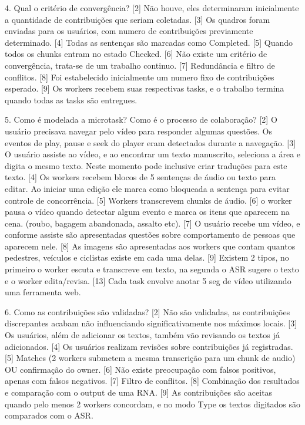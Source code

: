 4.	Qual o critério de convergência?
[2] Não houve, eles determinaram inicialmente a quantidade de contribuições que seriam coletadas.
[3] Os quadros foram enviadas para os usuários, com numero de contribuições previamente determinado.
[4] Todas as sentenças são marcadas como Completed.
[5] Quando todos os chunks entram no estado Checked.
[6] Não existe um critério de convergência, trata-se de um trabalho continuo. 
[7] Redundância e filtro de conflitos.
[8] Foi estabelecido inicialmente um numero fixo de contribuições esperado.
[9] Os workers recebem suas respectivas tasks, e o trabalho termina quando todas as tasks são entregues.

5.	Como é modelada a microtask? Como é o processo de colaboração?
[2] O usuário precisava navegar pelo vídeo para responder algumas questões. Os eventos de play, pause e seek do player eram detectados durante a navegação.
[3] O usuário assiste ao vídeo, e ao encontrar um texto manuscrito, seleciona a área e digita o mesmo texto. Neste momento pode inclusive criar traduções para este texto.
[4] Os workers recebem blocos de 5 sentenças de áudio ou texto para editar. Ao iniciar uma edição ele marca como bloqueada a sentença para evitar controle de concorrência.
[5] Workers transcrevem chunks de áudio.
[6] o worker pausa o vídeo quando detectar algum evento e marca os itens que aparecem na cena. (roubo, bagagem abandonada, assalto etc).
[7] O usuário recebe um vídeo, e conforme assiste são apresentadas questões sobre comportamento de pessoas que aparecem nele.
[8] As imagens são apresentadas aos workers que contam quantos pedestres, veículos e ciclistas existe em cada uma delas.
[9] Existem 2 tipos, no primeiro o worker escuta e transcreve em texto, na segunda o ASR sugere o texto e o worker edita/revisa.
[13] Cada task envolve anotar 5 seg de vídeo utilizando uma ferramenta web.


6.	Como as contribuições são validadas?
[2] Não são validadas, as contribuições discrepantes acabam não influenciando significativamente nos máximos locais.
[3] Os usuários, além de adicionar os textos, também vão revisando os textos já adicionados.
[4] Os usuários realizam revisões sobre contribuições já registradas.
[5] Matches (2 workers submetem a mesma transcrição para um chunk de audio) OU confirmação do owner.
[6] Não existe preocupação com falsos positivos, apenas com falsos negativos.
[7] Filtro de conflitos.
[8] Combinação dos resultados e comparação com o output de uma RNA.
[9] As contribuições são aceitas quando pelo menos 2 workers concordam, e no modo Type os textos digitados são comparados com o ASR.



